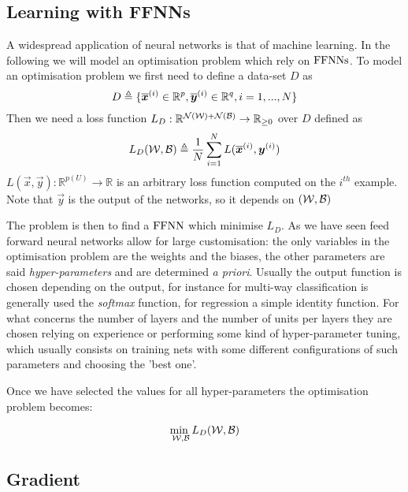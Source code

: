 \subsection{Learning with FFNNs}
A widespread application of neural networks is that of machine learning. In the following we will model an optimisation problem which rely on $\mathrm{FFNNs}$.
To model an optimisation problem we first need to define a data-set $D$ as 
\begin{equation}
D\triangleq\{\overline{\boldsymbol{x}}^{(i)} \in \mathbb{R}^p, \overline{\boldsymbol{y}}^{(i)} \in \mathbb{R}^q,  i=1,...,N\}
\end{equation}
Then we need a loss function $L_D:\mathbb{R}^{\mathcal{N}(\mathcal{W})+\mathcal{N}(\mathcal{B})} \rightarrow \mathbb{R}_{\geq 0}$ over $D$ defined as
\begin{equation}
L_D(\mathcal{W},\mathcal{B})\triangleq\frac{1}{N}\sum_{i=1}^N L(\overline{\boldsymbol{x}}^{(i)},\boldsymbol{y}^{(i)}) 
\end{equation}
$L(\vec{x},\vec{y}):\mathbb{R}^{p(U)} \rightarrow \mathbb{R}$ is an arbitrary loss function computed on the $i^{th}$ example. Note that $\vec{y}$ is the output of the
networks, so it depends on $(\mathcal{W},\mathcal{B})$


The problem is then to find a $\mathrm{FFNN}$ which minimise $L_D$. As we have seen feed forward neural networks allow for large customisation: the only variables in the optimisation problem are the weights
and the biases, the other
parameters are said \textit{hyper-parameters} and are determined \textit{a priori}. Usually the output function is chosen depending on the output, for instance for multi-way classification
is generally used the \textit{softmax} function, for regression a simple identity function.
For what concerns the number of layers and the number of units per layers they are chosen relying on experience or performing some kind of hyper-parameter tuning, which usually consists on training nets
with some different configurations of such parameters and choosing the 'best one'.

Once we have selected the values for all hyper-parameters the optimisation problem becomes:

\begin{equation}
\underset{\mathcal{W},\mathcal{B}}{\text{min  }} L_D(\mathcal{W},\mathcal{B}) \\
\end{equation}


\subsection{Gradient}


